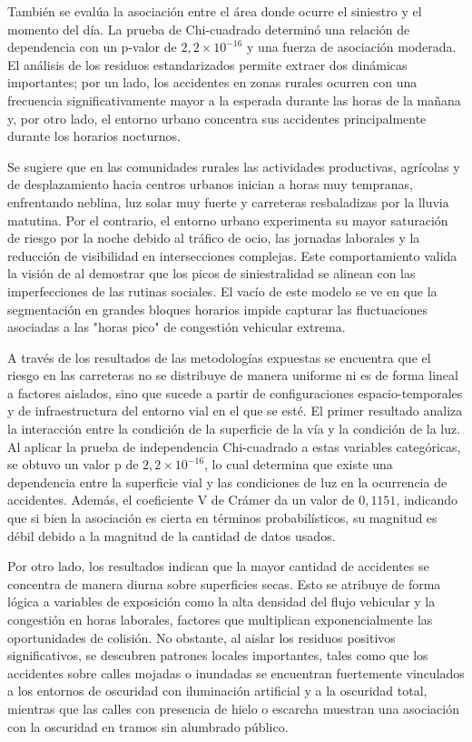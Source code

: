 \documentclass[12pt]{article}
\begin{document}
También se evalúa la asociación entre el área donde ocurre el siniestro y el momento del día. 
La prueba de Chi-cuadrado determinó una relación de dependencia con un p-valor de $2,2 \times 10^{-16}$ y una fuerza de asociación moderada. El análisis de los residuos estandarizados permite extraer dos dinámicas importantes; por un lado, los accidentes en zonas rurales ocurren con una frecuencia significativamente mayor a la esperada durante las horas de la mañana y, por otro lado, el entorno urbano concentra sus accidentes principalmente durante los horarios nocturnos.

Se sugiere que en las comunidades rurales las actividades productivas, agrícolas y de desplazamiento hacia centros urbanos inician a horas muy tempranas, enfrentando neblina, luz solar muy fuerte y carreteras resbaladizas por la lluvia matutina. Por el contrario, el entorno urbano experimenta su mayor saturación de riesgo por la noche debido al tráfico de ocio, las jornadas laborales y la reducción de visibilidad en intersecciones complejas. Este comportamiento valida la visión de \textcite{HOSSEINIAN2012} al demostrar que los picos de siniestralidad se alinean con las imperfecciones de las rutinas sociales. El vacío de este modelo se ve en que la segmentación en grandes bloques horarios impide capturar las fluctuaciones asociadas a las "horas pico" de congestión vehicular extrema.

A través de los resultados de las metodologías expuestas se encuentra que el riesgo en las carreteras no se distribuye de manera uniforme ni es de forma lineal a factores aislados, sino que sucede a partir de configuraciones espacio-temporales y de infraestructura del entorno vial en el que se esté. El primer resultado analiza la interacción entre la condición de la superficie de la vía y la condición de la luz. Al aplicar la prueba de independencia Chi-cuadrado a estas variables categóricas, se obtuvo un valor p de $2,2 \times 10^{-16}$, lo cual determina que existe una dependencia entre la superficie vial y las condiciones de luz en la ocurrencia de accidentes. Además, el coeficiente V de Crámer da un valor de $0,1151$, indicando que si bien la asociación es cierta en términos probabilísticos, su magnitud es débil debido a la magnitud de la cantidad de datos usados.

Por otro lado, los resultados indican que la mayor cantidad de accidentes se concentra de manera diurna sobre superficies secas. Esto se atribuye de forma lógica a variables de exposición como la alta densidad del flujo vehicular y la congestión en horas laborales, factores que multiplican exponencialmente las oportunidades de colisión. No obstante, al aislar los residuos positivos significativos, se descubren patrones locales importantes, tales como que los accidentes sobre calles mojadas o inundadas se encuentran fuertemente vinculados a los entornos de oscuridad con iluminación artificial y a la oscuridad total, mientras que las calles con presencia de hielo o escarcha muestran una asociación con la oscuridad en tramos sin alumbrado público.
\end{document}
